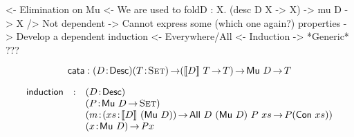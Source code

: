 \begin{structure}
<- Elimination on Mu
    <- We are used to foldD : \forall X. (desc D X -> X) -> mu D -> X
        /> Not dependent
        -> Cannot express some (which one again?) properties
    -> Develop a dependent induction
        <- Everywhere/All
        <- Induction
    -> *Generic*
    ???
\end{structure}

\[
\F{cata} : \PITEL{D}{\Desc}
           \PI{T}{\Set}
           (\descop{D}{T}\To T) \To 
           \Mu{D} \To T 
\]

\[
\begin{array}{lcl}
\F{induction} & : & \PITEL{D}{\Desc}                \\
              &   & \PITEL{P}{\Mu{D} \To \Set}      \\
              &   & \PITEL{m}{\PI{xs}{\descop{D}{(\Mu{D})}} \All{D}{(\Mu{D})}{P}{xs} \To P (\Con{xs})} \\
              &   & \PI{x}{\Mu{D}} P x
\end{array}
\]

